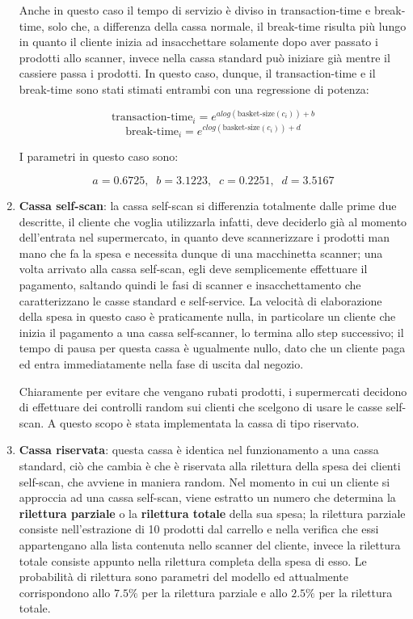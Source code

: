 \begin{enumerate}
Anche in questo caso il tempo di servizio è diviso in transaction-time e break-time, solo che, a differenza della cassa normale, il break-time risulta più lungo in quanto il cliente inizia ad insacchettare solamente dopo aver passato i prodotti allo scanner, invece nella cassa standard può iniziare già mentre il cassiere passa i prodotti. In questo caso, dunque, il transaction-time e il break-time sono stati stimati entrambi con una regressione di potenza:

\begin{equation}\label{eq:transaction-time-self-service}
\text{transaction-time}_i = e^{a log(\text{basket-size}(c_i)) + b}
\end{equation}
\begin{equation}\label{eq:break-time-self-service}
\text{break-time}_i = e^{c log(\text{basket-size}(c_i)) + d}
\end{equation}

I parametri in questo caso sono:

\begin{equation}
a = 0.6725, \;\; b = 3.1223, \;\; c = 0.2251, \;\; d = 3.5167
\end{equation}

\item \textbf{Cassa self-scan}: la cassa self-scan si differenzia totalmente dalle prime due descritte, il cliente che voglia utilizzarla infatti, deve deciderlo già al momento dell'entrata nel supermercato, in quanto deve scannerizzare i prodotti man mano che fa la spesa e necessita dunque di una macchinetta scanner; una volta arrivato alla cassa self-scan, egli deve semplicemente effettuare il pagamento, saltando quindi le fasi di scanner e insacchettamento che caratterizzano le casse standard e self-service. La velocità di elaborazione della spesa in questo caso è praticamente nulla, in particolare un cliente che inizia il pagamento a una cassa self-scanner, lo termina allo step successivo; il tempo di pausa per questa cassa è ugualmente nullo, dato che un cliente paga ed entra immediatamente nella fase di uscita dal negozio.

Chiaramente per evitare che vengano rubati prodotti, i supermercati decidono di effettuare dei controlli random sui clienti che scelgono di usare le casse self-scan. A questo scopo è stata implementata la cassa di tipo riservato.
\item \textbf{Cassa riservata}: questa cassa è identica nel funzionamento a una cassa standard, ciò che cambia è che è riservata alla rilettura della spesa dei clienti self-scan, che avviene in maniera random. Nel momento in cui un cliente si approccia ad una cassa self-scan, viene estratto un numero che determina la \textbf{rilettura parziale} o la \textbf{rilettura totale} della sua spesa;
la rilettura parziale consiste nell'estrazione di 10 prodotti dal carrello e nella verifica che essi appartengano alla lista contenuta nello scanner del cliente, invece la rilettura totale consiste appunto nella rilettura completa della spesa di esso. Le probabilità di rilettura sono parametri del modello ed attualmente corrispondono allo $7.5 \%$ per la rilettura parziale e allo $2.5 \%$ per la rilettura totale.


\end{enumerate}
